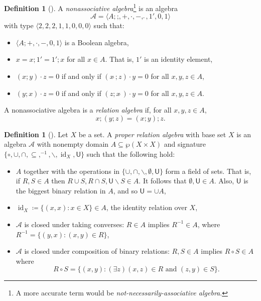 \documentclass[12pt]{article}
\theoremstyle{definition}
\newtheorem{definition}[subsection]{Definition}
\newcommand{\A}{\mathcal{A} }
\newcommand{\comp}{\mathbin{;}}%
\newcommand{\meet}{\mathbin{\cdot}}%
\newcommand{\join}{\mathbin{+}}%
\newcommand{\con}[1]{#1\breve{\ }}
\newcommand{\id}{{1'}}%
\renewcommand{\top}{1}%
\DeclareMathOperator{\setid}{\operatorname{id} }
\newcommand{\uni}{\mathsf{U} }
\begin{document}
\begin{definition}[\cite{Maddux1982}]
  A \emph{nonassociative algebra}\footnote{A more accurate term would be \emph{not-necessarily-associative algebra}.} is an algebra $$\A = \langle A;  \comp, \join, \meet, -, \con{}, \id, 0, \top \rangle$$ with type $\langle 2, 2, 2, 1, 1, 0, 0, 0 \rangle$ such that:
\begin{itemize}
  \item $\langle A; \join, \meet, -, 0, \top \rangle$ is a Boolean algebra,
  \item $x = x \comp \id = \id \comp x$ for all $x \in A$. That is, $\id$ is an identity element,
  \item $(x \comp y) \meet z = 0$ if and only if $(\con{x} \comp z) \meet y = 0$ for all $x,y,z \in A$,
  \item $(y \comp x) \meet z = 0$ if and only if $(z \comp \con{x}) \meet y = 0$ for all $x,y,z \in A$.
\end{itemize}

  A nonassociative algebra is a \emph{relation algebra} if, for all $x,y,z \in A$,
\[
  x \comp (y \comp z) = (x \comp y) \comp z.
\]
\end{definition}

\begin{definition}[\cite{HirschHodkinson2002}]\label{defn:PRA}
  Let $X$ be a set. A \emph{proper relation algebra} with base set $X$ is an algebra $\A$ with nonempty domain $A \subseteq \wp(X \times X)$ and signature $\{ \circ, \cup, \cap, \subseteq, ^{-1}, \backslash, \setid_X, \uni\}$ such that the following hold:
\begin{itemize}
  \item $A$ together with the operations in $\{\cup, \cap, \backslash, \emptyset, \uni\}$ form a field of sets. That is, if $R, S \in A$ then $R \cup S, R \cap S, \uni \backslash S \in A$. It follows that $\emptyset, \uni \in A$. Also, $\uni$ is the biggest binary relation in $A$, and so $\uni = \cup A$,
  \item $\setid_X \coloneqq \{ (x,x) \colon x \in X \} \in A$, the identity relation over $X$,
  \item $\A$ is closed under taking converses: $R \in A$ implies $R^{-1} \in A$, where $R^{-1} = \{(y,x) \colon (x,y) \in R\}$,\newpage
  \item $\A$ is closed under composition of binary relations: $R, S \in A$ implies $R \circ S \in A$ where
\[
  R \circ S = \{(x,y) \colon (\exists z) (x,z) \in R \text{ and } (z,y) \in S \}.
\]
\end{itemize}
\end{definition}
\end{document}
